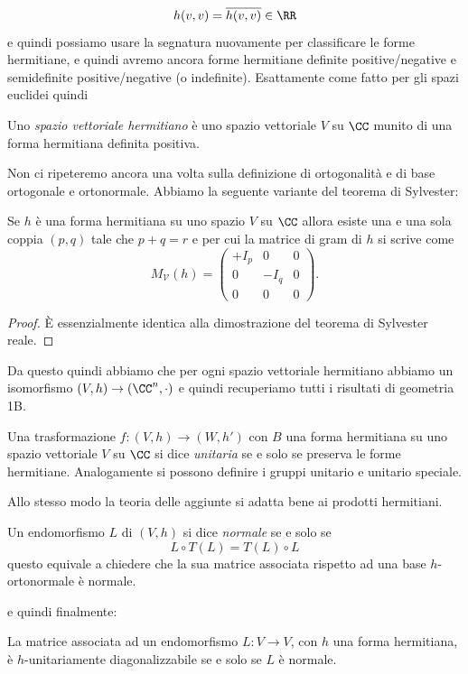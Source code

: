 \documentclass[11pt]{scrartcl}
\begin{document}
	$$h(v,v)=\overline{h(v,v)}\in \RR$$
	e quindi possiamo usare la segnatura nuovamente per classificare le forme hermitiane, e quindi avremo ancora forme hermitiane definite positive/negative e semidefinite positive/negative (o indefinite). Esattamente come fatto per gli spazi euclidei quindi
	\begin{definition}
		Uno \textit{spazio vettoriale hermitiano} è uno spazio vettoriale $V$ su $\CC$ munito di una forma hermitiana definita positiva.
	\end{definition}
	Non ci ripeteremo ancora una volta sulla definizione di ortogonalità e di base ortogonale e ortonormale. Abbiamo la seguente variante del teorema di Sylvester:
	\begin{theorem}
		Se $h$ è una forma hermitiana su uno spazio $V$ su $\CC$ allora esiste una e una sola coppia $(p,q)$ tale che $p+q=r$ e per cui la matrice di gram di $h$ si scrive come
		$$
		M_\mathcal{V}(h)=
		\left(
		\begin{array}{c|c|c}
			+I_p & 0 & 0 \\
			\hline
			0 & -I_q & 0 \\
			\hline
			0 & 0 & 0
		\end{array}
		\right).
		$$ 
	\end{theorem}
	\begin{proof}
		\`E essenzialmente identica alla dimostrazione del teorema di Sylvester reale.
	\end{proof}
	Da questo quindi abbiamo che per ogni spazio vettoriale hermitiano abbiamo un isomorfismo $(V,h)\to (\CC^n,\cdot)$ e quindi recuperiamo tutti i risultati di geometria 1B. 
	\begin{definition}
		Una trasformazione $f:(V,h)\to (W,h')$ con $B$ una forma hermitiana su uno spazio vettoriale $V$ su $\CC$ si dice \textit{unitaria} se e solo se preserva le forme hermitiane. Analogamente si possono definire i gruppi unitario e unitario speciale.
	\end{definition}
	Allo stesso modo la teoria delle aggiunte si adatta bene ai prodotti hermitiani. 
	\begin{definition}
		Un endomorfismo $L$ di $(V,h)$ si dice \textit{normale} se e solo se 
		$$L\circ T(L)=T(L)\circ L$$
		questo equivale a chiedere che la sua matrice associata rispetto ad una base $h$-ortonormale è normale.
	\end{definition}
	e quindi finalmente:
	\begin{theorem}
		La matrice associata ad un endomorfismo $L:V\to V$, con $h$ una forma hermitiana, è $h$-unitariamente diagonalizzabile se e solo se $L$ è normale. 
	\end{theorem}
\end{document}

